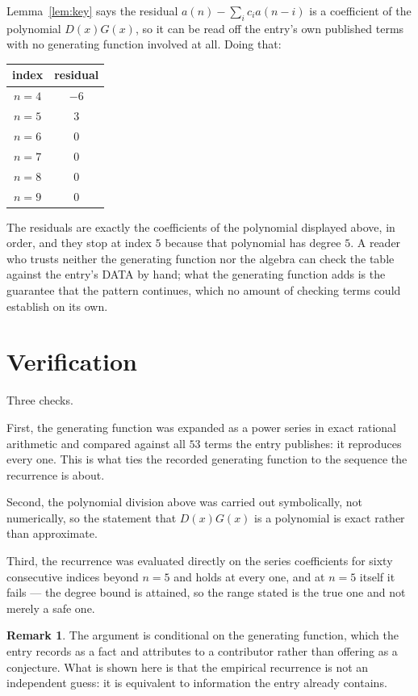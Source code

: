 \documentclass[11pt,a4paper]{article}
\theoremstyle{plain}
\theoremstyle{definition}
\newtheorem{remark}[theorem]{Remark}
\begin{document}
Lemma~\ref{lem:key} says the residual $a(n)-\sum_ic_ia(n-i)$ is a coefficient of the
polynomial $D(x)G(x)$, so it can be read off the entry's own published terms with no
generating function involved at all. Doing that:
\begin{center}
\begin{tabular}{cc}
index & residual \\ \hline
$n=4$ & $-6$ \\
$n=5$ & $3$ \\
$n=6$ & $0$ \\
$n=7$ & $0$ \\
$n=8$ & $0$ \\
$n=9$ & $0$
\end{tabular}
\end{center}
The residuals are exactly the coefficients of the polynomial displayed above, in order, and
they stop at index $5$ because that polynomial has degree $5$. A reader who trusts
neither the generating function nor the algebra can check the table against the entry's DATA
by hand; what the generating function adds is the guarantee that the pattern continues, which
no amount of checking terms could establish on its own.

\section{Verification}

Three checks.

First, the generating function was expanded as a power series in exact rational arithmetic and
compared against all $53$ terms the entry publishes: it reproduces every one. This is
what ties the recorded generating function to the sequence the recurrence is about.

Second, the polynomial division above was carried out symbolically, not numerically, so the
statement that $D(x)G(x)$ is a polynomial is exact rather than approximate.

Third, the recurrence was evaluated directly on the series coefficients for sixty consecutive
indices beyond $n=5$ and holds at every one, and at $n=5$ itself it fails --- the
degree bound is attained, so the range stated is the true one and not merely a safe one.

\begin{remark}
The argument is conditional on the generating function, which the entry records as a fact and
attributes to a contributor rather than offering as a conjecture. What is shown here is that
the empirical recurrence is not an independent guess: it is equivalent to information the
entry already contains.
\end{remark}
\end{document}

